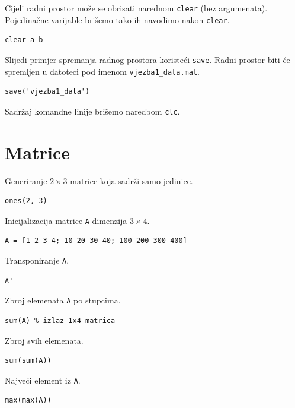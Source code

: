 \documentclass[a4paper, 10pt]{article}
\newcommand{\spec}[1]{\texttt{#1}} %
\begin{document}
Cijeli radni prostor može se obrisati narednom \spec{clear} (bez argumenata).
Pojedinačne varijable brišemo tako ih navodimo nakon \spec{clear}.

\begin{lstlisting}
clear a b
\end{lstlisting}

Slijedi primjer spremanja radnog prostora koristeći \spec{save}.
Radni prostor biti će spremljen u datoteci pod imenom \spec{vjezba1\_data.mat}.

\begin{lstlisting}
save('vjezba1_data')
\end{lstlisting}

Sadržaj komandne linije brišemo naredbom \spec{clc}.


\section{Matrice}
\label{sec:matrice}

Generiranje $2 \times 3$ matrice koja sadrži samo jedinice.

\begin{lstlisting}
ones(2, 3)
\end{lstlisting}

Inicijalizacija matrice \spec{A} dimenzija $3 \times 4$.

\begin{lstlisting}
A = [1 2 3 4; 10 20 30 40; 100 200 300 400]
\end{lstlisting}

Transponiranje \spec{A}.
\begin{lstlisting}
A'
\end{lstlisting}

Zbroj elemenata \spec{A} po stupcima.

\begin{lstlisting}
sum(A) % izlaz 1x4 matrica
\end{lstlisting}

Zbroj svih elemenata.

\begin{lstlisting}
sum(sum(A))
\end{lstlisting}

Najveći element iz \spec{A}.

\begin{lstlisting}
max(max(A))
\end{lstlisting}
\end{document}

